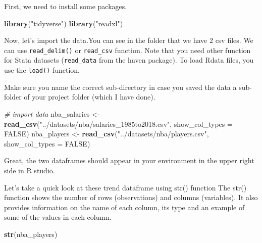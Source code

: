 \documentclass[
]{book}
\newenvironment{Shaded}{\begin{snugshade}}{\end{snugshade}}
\newcommand{\AttributeTok}[1]{\textcolor[rgb]{0.13,0.29,0.53}{#1}}
\newcommand{\CommentTok}[1]{\textcolor[rgb]{0.56,0.35,0.01}{\textit{#1}}}
\newcommand{\ConstantTok}[1]{\textcolor[rgb]{0.56,0.35,0.01}{#1}}
\newcommand{\FunctionTok}[1]{\textcolor[rgb]{0.13,0.29,0.53}{\textbf{#1}}}
\newcommand{\NormalTok}[1]{#1}
\newcommand{\OtherTok}[1]{\textcolor[rgb]{0.56,0.35,0.01}{#1}}
\newcommand{\StringTok}[1]{\textcolor[rgb]{0.31,0.60,0.02}{#1}}
\begin{document}
First, we need to install some packages.

\begin{Shaded}
\begin{Highlighting}[]
\FunctionTok{library}\NormalTok{(}\StringTok{"tidyverse"}\NormalTok{)}
\FunctionTok{library}\NormalTok{(}\StringTok{"readxl"}\NormalTok{)}
\end{Highlighting}
\end{Shaded}

Now, let's import the data.You can see in the folder that we have 2 csv files.
We can use \texttt{read\_delim()} or \texttt{read\_csv} function. Note that you need other function for Stata datasets (\texttt{read\_data} from the haven package). To load Rdata files, you use the \texttt{load()} function.

Make sure you name the correct sub-directory in case you saved the data a sub-folder of your project folder (which I have done).

\begin{Shaded}
\begin{Highlighting}[]
\CommentTok{\# import data }
\NormalTok{nba\_salaries }\OtherTok{\textless{}{-}} \FunctionTok{read\_csv}\NormalTok{(}\StringTok{"../datasets/nba/salaries\_1985to2018.csv"}\NormalTok{, }\AttributeTok{show\_col\_types =} \ConstantTok{FALSE}\NormalTok{)}
\NormalTok{nba\_players }\OtherTok{\textless{}{-}} \FunctionTok{read\_csv}\NormalTok{(}\StringTok{"../datasets/nba/players.csv"}\NormalTok{, }\AttributeTok{show\_col\_types =} \ConstantTok{FALSE}\NormalTok{)}
\end{Highlighting}
\end{Shaded}

Great, the two dataframes should appear in your environment in the upper right side in R studio.

Let's take a quick look at these trend dataframe using str() function The str() function shows the number of rows (observations) and columns (variables). It also provides information on the name of each column, its type and an example of some of the values in each column.

\begin{Shaded}
\begin{Highlighting}[]
\FunctionTok{str}\NormalTok{(nba\_players)}
\end{Highlighting}
\end{Shaded}
\end{document}
